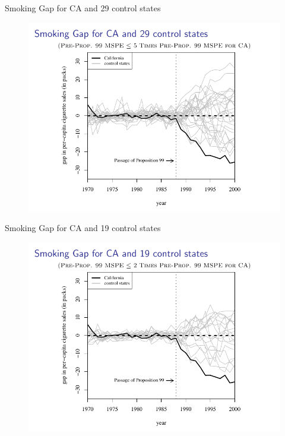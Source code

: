 \documentclass{beamer}
\begin{document}
\begin{frame}{Smoking Gap for CA and 29 control states}
	
	\begin{figure}
	\includegraphics[scale=0.75]{./lecture_includes/abadie_9.pdf}
	\end{figure}
\end{frame}

\begin{frame}{Smoking Gap for CA and 19 control states}
	
	\begin{figure}
	\includegraphics[scale=0.75]{./lecture_includes/abadie_10.pdf}
	\end{figure}
\end{frame}
\end{document}
